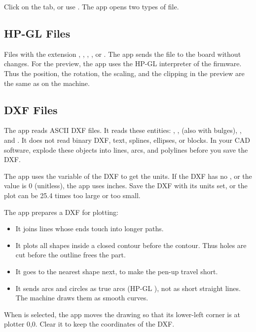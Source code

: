 Click  on the  tab, or use
. The app opens two types of
file.

\subsection{HP-GL Files}

Files with the extension , , , ,
or . The app sends the file to the board without changes. For the
preview, the app uses the HP-GL interpreter of the firmware. Thus the
position, the rotation, the scaling, and the clipping in the preview are the
same as on the machine.

\subsection{DXF Files}

The app reads ASCII DXF files. It reads these entities: ,
,  (also with bulges), , and
. It does not read binary DXF, text, splines, ellipses, or
blocks. In your CAD software, explode these objects into lines, arcs, and
polylines before you save the DXF.

\begin{caution}
The app uses the  variable of the DXF to get the units. If
the DXF has no , or the value is 0 (unitless), the app uses
inches. Save the DXF with its units set, or the plot can be 25.4 times too
large or too small.
\end{caution}

The app prepares a DXF for plotting:

\begin{itemize}
  \item It joins lines whose ends touch into longer paths.
  \item It plots all shapes inside a closed contour before the contour.
        Thus holes are cut before the outline frees the part.
  \item It goes to the nearest shape next, to make the pen-up travel short.
  \item It sends arcs and circles as true arcs (HP-GL ), not as
        short straight lines. The machine draws them as smooth curves.
\end{itemize}

When  is selected, the app moves the drawing so
that its lower-left corner is at plotter 0,0. Clear it to keep the
coordinates of the DXF.

